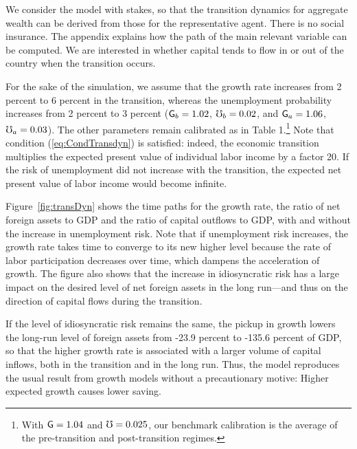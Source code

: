 \documentclass[titlepage,abstract,letterpaper]{econtex}
\begin{document}
We consider the model with stakes, so that the transition dynamics for aggregate wealth can be derived from those for the representative agent. There is no social insurance. The appendix explains how the path of the main relevant variable can be computed. We are interested in whether capital tends to flow in or out of the country when the transition occurs.

For the sake of the simulation, we assume that the growth rate
increases from 2 percent to 6 percent in the transition, whereas the
unemployment probability increases from 2 percent to 3 percent
($\mathsf{G}_b=1.02$, $\mho_b=0.02$, and $\mathsf{G}_a=1.06$,
$\mho_a=0.03$). The other parameters remain calibrated as in Table
1.\footnote{With $\mathsf{G}=1.04$ and $\mho=0.025$, our benchmark
  calibration is the average of the pre-transition and post-transition
  regimes.} Note that condition (\ref{eq:CondTransdyn}) is satisfied:
indeed, the economic transition multiplies the expected present value
of individual labor income by a factor 20. If the risk of unemployment
did not increase with the transition, the expected net present value
of labor income would become infinite.

Figure~\ref{fig:transDyn} shows the time paths for the growth rate,
the ratio of net foreign assets to GDP and the ratio of capital
outflows to GDP, with and without the increase in unemployment
risk. Note that if unemployment risk increases, the growth rate takes
time to converge to its new higher level because the rate of labor
participation decreases over time, which dampens the acceleration of
growth. The figure also shows that the increase in idiosyncratic risk
has a large impact on the desired level of net foreign assets in the
long run---and thus on the direction of capital flows during the
transition. 

If the level of idiosyncratic risk remains the same, the
pickup in growth lowers the long-run level of foreign assets from
-23.9 percent to -135.6 percent of GDP, so that the higher growth rate
is associated with a larger volume of capital inflows, both in the
transition and in the long run. Thus, the model reproduces the usual
result from growth models without a precautionary motive: Higher expected growth
causes lower saving.
\end{document}
